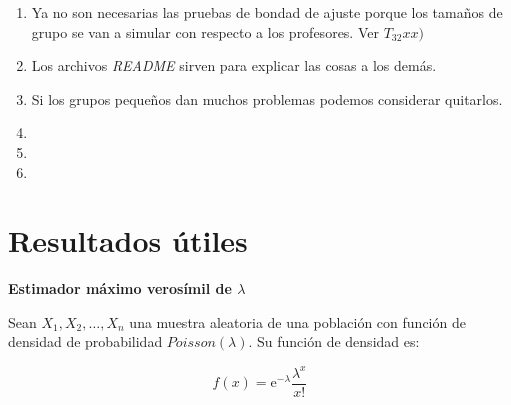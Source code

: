 \begin{appendices}
\begin{enumerate}
  \item Ya no son necesarias las pruebas de bondad de ajuste porque los tamaños de grupo se van a simular con respecto a los profesores. Ver $T_{32} xx)$
  
  \item Los archivos \textit{README} sirven para explicar las cosas a los demás.
  
  \item Si los grupos pequeños dan muchos problemas podemos considerar quitarlos.
  
  \item 
  
  \item 
  
  \item 
\end{enumerate}

\chapter{Resultados útiles} %

\begin{defn} \label{EMVlambda}
\textbf{Estimador máximo verosímil de $\lambda$}

Sean $X_{1}, X_{2}, \ldots, X_{n}$ una muestra aleatoria de una población con función de densidad de probabilidad $Poisson(\lambda)$. Su función de densidad es:

\begin{equation}
f(x) = \mathrm{e}^{-\lambda} \dfrac{\lambda^{x}}{x!}
\end{equation}


\end{defn}
\end{appendices}
